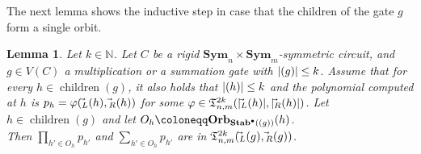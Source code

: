 \documentclass[11pt, DIV=15]{scrarticle}
\theoremstyle{definition}
\theoremstyle{plain}
\newtheorem{lemma}[definition]{Lemma}
\theoremstyle{remark}
\renewcommand{\phi}{\varphi}
\newcommand{\Sym}{\mathbf{Sym}}
\newcommand{\Stab}{\mathbf{Stab}}
\newcommand{\StabP}{\Stab^{\bullet}}
\newcommand{\Orb}{\mathbf{Orb}}
\DeclareMathOperator{\child}{children}
\newcommand{\bbN}{\mathbb{N}}
\let\sup\relax
\DeclareMathOperator{\sup}{sup}
\begin{document}
 	The next lemma shows the inductive step in case that the children of the gate $g$ form a single orbit.
 	\begin{lemma}
 		\label{lem:productOfOneChildOrbit}
 		Let $k \in \bbN$.
 		Let $C$ be a rigid $\Sym_{n} \times \Sym_{m}$-symmetric circuit, and $g \in V(C)$ a multiplication or a summation gate with $|\sup(g)| \leq k$.
 		Assume that for every $h \in \child(g)$, it also holds
                that $|\sup(h)| \leq k$ and the polynomial computed at $h$ is $p_h = \phi(\vec{\sup}_L(h), \vec{\sup}_R(h))$ for some $\phi \in \mathfrak{T}^{2k}_{n,m}(|\vec{\sup}_L(h)|, |\vec{\sup}_R(h)|)$.
 		Let $h \in \child(g)$ and let $O_h \coloneqq \Orb_{\StabP(\sup(g))}(h)$.\\
 		Then $\prod_{h' \in O_h} p_{h'}$ and $\sum_{h' \in O_h} p_{h'}$ are in $\mathfrak{T}_{n,m}^{2k}(\vec{\sup}_L(g), \vec{\sup}_R(g))$.
 	\end{lemma}	
\end{document}
